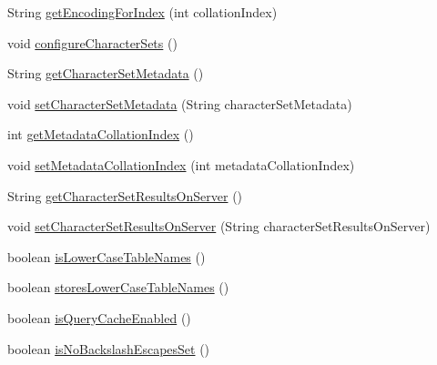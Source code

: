 \begin{DoxyCompactItemize}
\item 
String \mbox{\hyperlink{classcom_1_1mysql_1_1cj_1_1protocol_1_1x_1_1_x_server_session_a3184e5a4acad8af656fb72a6b57a5fa8}{get\+Encoding\+For\+Index}} (int collation\+Index)
\item 
void \mbox{\hyperlink{classcom_1_1mysql_1_1cj_1_1protocol_1_1x_1_1_x_server_session_a260688fd1a089273e598fb0e95a066b7}{configure\+Character\+Sets}} ()
\item 
String \mbox{\hyperlink{classcom_1_1mysql_1_1cj_1_1protocol_1_1x_1_1_x_server_session_abe3c372a1bd8d70a5229778e8cf17a62}{get\+Character\+Set\+Metadata}} ()
\item 
void \mbox{\hyperlink{classcom_1_1mysql_1_1cj_1_1protocol_1_1x_1_1_x_server_session_a0f5880e0800be3703db6c98bcb5ee7ed}{set\+Character\+Set\+Metadata}} (String character\+Set\+Metadata)
\item 
int \mbox{\hyperlink{classcom_1_1mysql_1_1cj_1_1protocol_1_1x_1_1_x_server_session_a09e1089e8ae704f9d38ee7c87ca18d72}{get\+Metadata\+Collation\+Index}} ()
\item 
void \mbox{\hyperlink{classcom_1_1mysql_1_1cj_1_1protocol_1_1x_1_1_x_server_session_a6f374cd57560302ea8fdeaa141227cae}{set\+Metadata\+Collation\+Index}} (int metadata\+Collation\+Index)
\item 
String \mbox{\hyperlink{classcom_1_1mysql_1_1cj_1_1protocol_1_1x_1_1_x_server_session_aee32f7a4b8a0e1fccc0e7fb8bba92d98}{get\+Character\+Set\+Results\+On\+Server}} ()
\item 
void \mbox{\hyperlink{classcom_1_1mysql_1_1cj_1_1protocol_1_1x_1_1_x_server_session_a53a07197cb0512e9b74ddd1e4478dbb8}{set\+Character\+Set\+Results\+On\+Server}} (String character\+Set\+Results\+On\+Server)
\item 
boolean \mbox{\hyperlink{classcom_1_1mysql_1_1cj_1_1protocol_1_1x_1_1_x_server_session_a835d6363081496694ef7760c4fe555c8}{is\+Lower\+Case\+Table\+Names}} ()
\item 
boolean \mbox{\hyperlink{classcom_1_1mysql_1_1cj_1_1protocol_1_1x_1_1_x_server_session_a7b76659fa43ab520da92bdfdfcb4d67a}{stores\+Lower\+Case\+Table\+Names}} ()
\item 
boolean \mbox{\hyperlink{classcom_1_1mysql_1_1cj_1_1protocol_1_1x_1_1_x_server_session_abf4e07003f9f0633af5a0957bb7a253d}{is\+Query\+Cache\+Enabled}} ()
\item 
boolean \mbox{\hyperlink{classcom_1_1mysql_1_1cj_1_1protocol_1_1x_1_1_x_server_session_a134bc8110f74e712e0944ae695809400}{is\+No\+Backslash\+Escapes\+Set}} ()
\item 

\end{DoxyCompactItemize}
